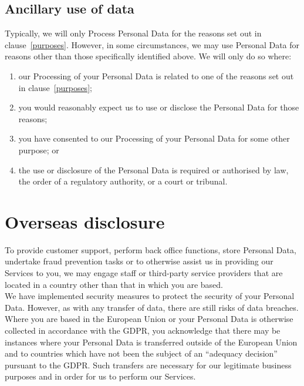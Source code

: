 \documentclass[10pt]{article}
\begin{document}
\subsection{Ancillary use of data}
Typically, we will only Process Personal Data for the reasons set out in clause~\ref{purposes}. However, in some circumstances, we may use Personal Data for reasons other than those specifically identified above. We will only do so where:
\begin{enumerate}[(1)]
	\item our Processing of your Personal Data is related to one of the reasons set out in clause~\ref{purposes};

	\item you would reasonably expect us to use or disclose the Personal Data for those reasons;

	\item you have consented to our Processing of your Personal Data for some other purpose; or

	\item the use or disclosure of the Personal Data is required or authorised by law, the order of a regulatory authority, or a court or tribunal.
\end{enumerate}


\section{Overseas disclosure}
To provide customer support, perform back office functions, store Personal Data, undertake fraud prevention tasks or to otherwise assist us in providing our Services to you, we may engage staff or third-party service providers that are located in a country other than that in which you are based. \\

We have implemented security measures to protect the security of your Personal Data. However, as with any transfer of data, there are still risks of data breaches. \\

Where you are based in the European Union or your Personal Data is otherwise collected in accordance with the GDPR, you acknowledge that there may be instances where your Personal Data is transferred outside of the European Union and to countries which have not been the subject of an ``adequacy decision'' pursuant to the GDPR. Such transfers are necessary for our legitimate business purposes and in order for us to perform our Services. \\
\end{document}
